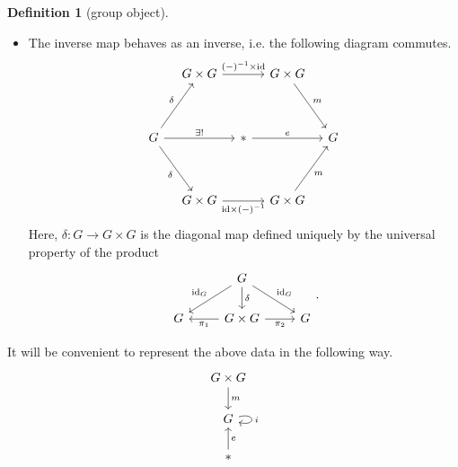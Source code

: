 \documentclass[a4paper,10pt]{scrreprt}
\newcommand{\id}{\mathrm{id}}
\theoremstyle{definition}
\newtheorem{definition}{Definition}[section]
\theoremstyle{plain}
\theoremstyle{remark}
\begin{document}
\begin{definition}[group object]
\begin{itemize}
    \item The inverse map behaves as an inverse, i.e. the following diagram commutes.
      \begin{equation*}
        \begin{tikzcd}[row sep=3.6em,column sep=1em]
          & G\times G 
          \arrow[rr,"(-)^{-1}\times\id"] 
          & & G\times G 
          \arrow[dr,"m"] 
          \\
          G 
          \arrow[ur,"\delta"] 
          \arrow[rr,"\exists!"] 
          \arrow[dr,"\delta"'] 
          & & * 
          \arrow[rr,"e"] 
          & & G 
          \\
          & G\times G 
          \arrow[rr,"\id\times (-)^{-1}"'] 
          & & G\times G 
          \arrow[ur,"m"']
        \end{tikzcd}
      \end{equation*}
      Here, $\delta\colon G \to G \times G$ is the diagonal map defined uniquely by the universal property of the product
      \begin{equation*}
        \begin{tikzcd}
          & G
          \arrow[dr, "\mathrm{id}_{G}"]
          \arrow[dl, swap, "\mathrm{id}_{G}"]
          \arrow[d, "\delta"]
          \\
          G 
          & G \times G
          \arrow[l, "\pi_{1}"]
          \arrow[r, swap, "\pi_{2}"]
          & G
        \end{tikzcd}.
      \end{equation*}
  \end{itemize}

  It will be convenient to represent the above data in the following way.
  \begin{equation*}
    \begin{tikzcd}
      G \times G
      \arrow[d, "m"]
      \\
      G
      \arrow[loop right, "i"]
      \\
      *
      \arrow[u, swap, "e"]
    \end{tikzcd}
  \end{equation*}
\end{definition} 
\end{document}

